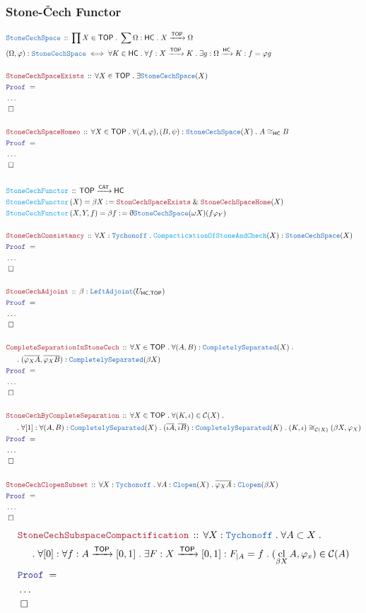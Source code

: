 \documentclass[12pt]{scrartcl}
\newcommand{\TYPE}[1]{\textcolor{NavyBlue}{\mathtt{#1}}}
\newcommand{\FUNC}[1]{\textcolor{Cerulean}{\mathtt{#1}}}
\newcommand{\LOGIC}[1]{\textcolor{Blue}{\mathtt{#1}}}
\newcommand{\THM}[1]{\textcolor{Maroon}{\mathtt{#1}}}
\renewcommand{\.}{\; . \;}
\newcommand{\de}{: \kern 0.1pc =}
\newcommand{\Act}[1]{\left( #1 \right)}
\newcommand{\Theorem}[2]{& \THM{#1} \, :: \, #2 \\ & \Proof = \\ }
\newcommand{\DeclareType}[2]{& \TYPE{#1} \, :: \, #2 \\}
\newcommand{\DefineType}[3]{& #1 : \TYPE{#2} \iff #3 \\}
\newcommand{\DeclareFunc}[2]{& \FUNC{#1} \, :: \, #2 \\}
\newcommand{\DefineNamedFunc}[4]{&  \FUNC{#1}\Act{#2} = #3 \de #4 \\}
\newcommand{\NewLine}{\\ & \kern 1pc}
\newcommand{\Page}[1]{ \begin{align*} #1 \end{align*}   }
\newcommand{ \bd }{ \ByDef }
\newcommand{\NoProof}{ & \ldots \\ \EndProof}
\renewcommand{\And}{\; \& \;}
\newcommand{\Arrow}{\xrightarrow}
\newcommand{\QED}{\; \square}
\newcommand{\EndProof}{& \QED \\}
\newcommand{\ByDef}{\eth}
\newcommand{\Proof}{\LOGIC{Proof} \; }
\newcommand{\C}{\mathcal{C}}
\newcommand{\CAT}{\mathsf{CAT}}
\DeclareMathOperator*{\cl}{cl}
\newcommand{\TOP}{\mathsf{TOP}}
\newcommand{\HC}{\mathsf{HC}}
\begin{document}
\subsubsection{Stone-\v{C}ech Functor}
\Page{
	\DeclareType{StoneCechSpace}{\prod X \in \TOP \. \sum \Omega : \HC \.  X \Arrow{\TOP} \Omega }
	\DefineType{(\Omega,\varphi)}{StoneCechSpace}
	{
		 \forall K \in \HC \. \forall f : X \Arrow{\TOP} K \. 
		 \exists g : \Omega \Arrow{\HC} K :  f = \varphi g  
	}
	\\
	\Theorem{StoneCechSpaceExists}
	{
		\forall X \in \TOP \. \exists \TYPE{StoneCechSpace}(X)
	}
	\NoProof
	\\
	\Theorem{StoneCechSpaceHomeo}
	{
		\forall X \in \TOP \. \forall (A,\varphi),(B,\psi) : \TYPE{StoneCechSpace}(X)
		\. A \cong_{\HC} B 
	}
	\NoProof
	\\
	\DeclareFunc{StoneCechFunctor}{\TOP \Arrow{\CAT} \HC}
	\DefineNamedFunc{StoneCechFunctor}{X}{\beta X}{\THM{StonCechSpaceExists}
		\And \THM{StoneCechSpaceHome}(X)}
	\DefineNamedFunc{StoneCechFunctor}{X,Y,f}{\beta f}{\bd \TYPE{StoneCechSpace}(\omega X)(f\varphi_Y)}
	\\
	\Theorem{StoneCechConsistancy}
	{
		\forall X : \TYPE{Tychonoff} \. \FUNC{CompacticationOfStoneAndChech}(X) : \TYPE{StoneCechSpace}(X)
	}
	\NoProof
	\\
	\Theorem{StoneCechAdjoint}{\beta : \TYPE{LeftAdjoint}(U_{\HC,\TOP})}
	\NoProof
	\\
	\Theorem{CompleteSeparationInStoneCech}
	{
		\forall X \in \TOP \. 
		\forall (A,B)  :  \TYPE{CompletelySeparated}(X) \. \NewLine \.
		(\overline{\varphi_X A}, \overline{\varphi_X B})  : \TYPE{CompletelySeparated}(\beta X)
	}
	\NoProof
	\\
	\Theorem{StoneCechByCompleteSeparation}
	{
		\forall X \in \TOP \.
		\forall (K,\iota) \in \C(X) \.  \NewLine \.
		\forall [1] : \forall (A,B) : \TYPE{CompletelySeparated}(X) \.   
			(\overline{\iota A}, \overline{\iota B} ) : \TYPE{CompletelySeparated}(K)	 \.
		(K,\iota) \cong_{\C(X)} (\beta X,\varphi_X)	
	}
	\NoProof
	\\
	\Theorem{StoneCechClopenSubset}
	{
		\forall X : \TYPE{Tychonoff} \.
		\forall A  : \TYPE{Clopen}(X) \.
		\overline{\varphi_X A} : \TYPE{Clopen}(\beta X)		
	} 
	\NoProof
}\Page{
	\Theorem{ StoneCechSubspaceCompactification}
	{
	 	\forall X : \TYPE{Tychonoff} \.
	 	\forall A \subset X \. \NewLine \.
	 	\forall  [0] : \forall f : A \Arrow{\TOP} [0,1] \. \exists F : X \Arrow{\TOP} [0,1] : F_{|A} = f  \.
	 	 (\cl_{\beta X} A,\varphi_x) \in \C(A) 
	}
	\NoProof
	\\
}
\end{document}
